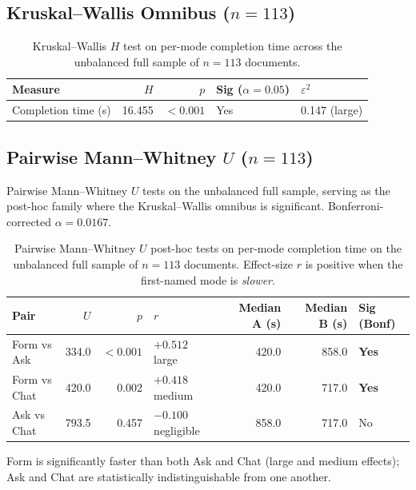 \subsection{Kruskal--Wallis Omnibus ($n = 113$)}

\begin{table}[H]
\centering
\caption{Kruskal--Wallis $H$ test on per-mode completion time
across the unbalanced full sample of $n = 113$ documents.}
\label{tab:app-timing-kw}
\small
\begin{tabular}{@{}l r r l l@{}}
\toprule
Measure & $H$ & $p$ & Sig ($\alpha = 0.05$) & $\varepsilon^2$ \\
\midrule
Completion time (s) & 16.455 & $<0.001$ & Yes & 0.147 (large) \\
\bottomrule
\end{tabular}
\end{table}

\subsection{Pairwise Mann--Whitney $U$ ($n = 113$)}

Pairwise Mann--Whitney $U$ tests on the unbalanced full sample,
serving as the post-hoc family where the Kruskal--Wallis omnibus
is significant. Bonferroni-corrected $\alpha = 0.0167$.

\begin{table}[H]
\centering
\caption{Pairwise Mann--Whitney $U$ post-hoc tests on per-mode
completion time on the unbalanced full sample of $n = 113$
documents. Effect-size $r$ is positive when the first-named mode
is \emph{slower}.}
\label{tab:app-timing-mwu}
\small
\setlength{\tabcolsep}{4pt}
\begin{tabular}{@{}l r r l r r l@{}}
\toprule
Pair & $U$ & $p$ & $r$ & Median A (s) & Median B (s) & Sig (Bonf) \\
\midrule
Form vs Ask  & 334.0 & $<0.001$ & $+0.512$ large       & 420.0 & 858.0 & \textbf{Yes} \\
Form vs Chat & 420.0 & 0.002    & $+0.418$ medium      & 420.0 & 717.0 & \textbf{Yes} \\
Ask vs Chat  & 793.5 & 0.457    & $-0.100$ negligible  & 858.0 & 717.0 & No \\
\bottomrule
\end{tabular}
\end{table}

Form is significantly faster than both Ask and Chat (large and
medium effects); Ask and Chat are statistically indistinguishable
from one another.
